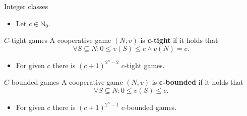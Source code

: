 \documentclass{beamer}
\begin{document}

\begin{frame}{Integer classes}
    \begin{itemize}
        \item Let $c \in \mathbb{N}_0$.
    \end{itemize}
    
    \begin{block}{$C$-tight games}
        A cooperative game $(N,v)$ is \textbf{c-tight} if it holds that
        \begin{displaymath}
            \forall S \subseteq N: 0 \leq v(S) \leq c \land v(N) = c.
        \end{displaymath}
    \end{block}

    \begin{itemize}
        \item For given $c$ there is $(c+1)^{2^n - 2}$ $c$-tight games.
    \end{itemize}
   
    \begin{block}{$C$-bounded games}
        A cooperative game $(N,v)$ is \textbf{c-bounded} if it holds that
        \begin{displaymath}
            \forall S \subseteq N: 0 \leq v(S) \leq c.
        \end{displaymath}
    \end{block}

    \begin{itemize}
        \item For given $c$ there is $(c+1)^{2^n - 1}$ $c$-bounded games.
    \end{itemize}

\end{frame}


\end{document}
